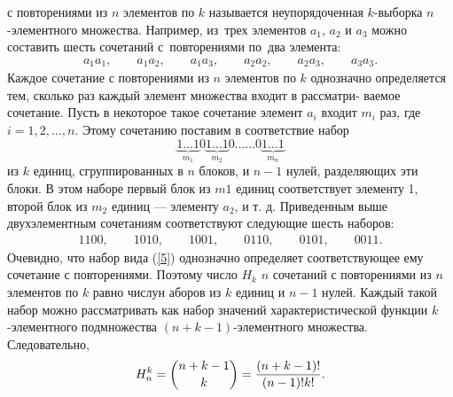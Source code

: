 \documentclass[12pt]{article}
\begin{document}
 с повторениями из $n$ элементов по $k$ называется неупорядоченная $k$-выборка $n$-элементного множества. Например, из~трех элементов $a_1$, $a_2$ и $a_3$ можно составить шесть сочетаний с~повторениями по~два элемента:
\begin{align*}
    a_1 a_1, \qquad a_1 a_2, \qquad a_1 a_3, \qquad a_2 a_2, \qquad a_2 a_3, \qquad  a_3 a_3.
    \end{align*}
    Каждое сочетание с повторениями из $n$ элементов по $k$ однозначно определяется тем, сколько раз каждый элемент множества входит в рассматри-
ваемое сочетание. Пусть в некоторое такое сочетание элемент $a_i$ входит $m_i$
раз, где $i = 1, 2,\ldots, n.$ Этому сочетанию поставим в соответствие набор
\begin{equation}
    \underbrace{1\ldots 1}_{m_1} 0\underbrace{1\ldots 1}_{m_2} 0\ldots\ldots 0  \underbrace{1\ldots 1}_{m_n}\label{5}
\end{equation}
из $k$ единиц, сгруппированных в $n$ блоков, и $n − 1$ нулей, разделяющих эти
блоки. В этом наборе первый блок из $m1$ единиц соответствует элементу
1, второй блок из $m_2$ единиц — элементу $a_2$, и т. д. Приведенным выше
двухэлементным сочетаниям соответствуют следующие шесть наборов:
\begin{align*}
    1100,\qquad 1010, \qquad 1001, \qquad 0110, \qquad 0101, \qquad 0011.
\end{align*}
Очевидно, что набор вида (\ref{5}) однозначно определяет соответствующее
ему сочетание с повторениями. Поэтому число $H_k$ $n$ сочетаний с повторениями из $n$ элементов по $k$ равно числун аборов из $k$ единиц и $n − 1$ нулей.
Каждый такой набор можно рассматривать как набор значений характеристической функции $k$-элементного подмножества $(n+k−1)$-элементного множества. Следовательно,
\begin{equation}
    H^k_n=\dbinom {n+k-1}k=\frac{(n+k-1)!}{(n-1)!k!}.
\end{equation}
\end{document}
